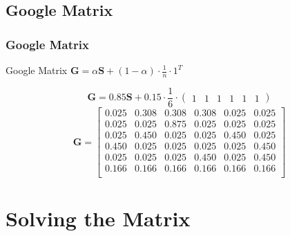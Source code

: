 \documentclass{beamer}
\begin{document}
\subsection{Google Matrix}
\begin{frame}
\frametitle{Google Matrix}
\begin{block}{Google Matrix}
$\textbf{G} = \alpha\textbf{S} + (1-\alpha)\cdot\frac{1}{n}\cdot 1^{T}$
\end{block}
\begin{example}
\[\textbf{G}=0.85\textbf{S} + 0.15\cdot\frac{1}{6}\cdot\left(
\begin{array}{cccccc}
1&1&1&1&1&1\end{array}
\right)
\]
\[\textbf{G}=\left[
\begin{array}{cccccc}
0.025 & 0.308 & 0.308 & 0.308 & 0.025 & 0.025 \\
0.025 & 0.025 & 0.875 & 0.025 & 0.025 & 0.025\\
0.025 & 0.450 & 0.025 & 0.025 & 0.450 & 0.025\\
0.450 & 0.025 & 0.025 & 0.025 & 0.025 & 0.450\\
0.025 & 0.025 & 0.025 & 0.450 & 0.025 &0.450 \\
0.166 & 0.166 & 0.166 & 0.166 & 0.166 & 0.166 \\
\end{array}
\right]	
\]
\end{example}
\end{frame}
\section{Solving the Matrix}
\end{document}
